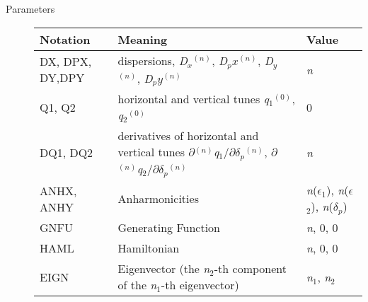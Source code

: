 \begin{description}
   \item[Parameters] 
     \begin{tabular}{p{2cm} p{7cm} p{2cm}}
       \hline 
       \textbf{Notation} & \textbf{Meaning} & \textbf{Value} \\ 
       \hline
       DX, DPX, DY,DPY & dispersions, \textit{D$_x$}$^{(n)}$,
       \textit{D$_px$}$^{(n)}$, \textit{D$_y$}$^{(n)}$,
       \textit{D$_py$}$^{(n)}$ &  
       \textit{n} \\ 
       \hline
       Q1, Q2 & horizontal and vertical tunes \textit{q}$_1$$^{(0)}$,
       \textit{q}$_2$$^{(0)}$ & 0 \\  
       \hline
       DQ1, DQ2 & derivatives of horizontal and vertical tunes
       $\partial$$^{(n)}$\textit{q}$_1$/$\partial$\textit{$\delta$}$_\textit{p}$$^{(n)}$,
       $\partial$$^{(n)}$\textit{q}$_2$/$\partial$\textit{$\delta$}$_\textit{p}$$^{(n)}$
       & \textit{n} \\  
       \hline
       ANHX, ANHY & Anharmonicities &
       \textit{n}(\textit{$\epsilon$}$_1$),
       \textit{n}(\textit{$\epsilon$}$_2$),
       \textit{n}(\textit{$\delta$}$_\textit{p}$) \\  
       \hline
       GNFU & Generating Function & \textit{n}, 0, 0 \\ 
       \hline
       HAML & Hamiltonian  & \textit{n}, 0, 0 \\ 
       \hline
       EIGN & Eigenvector (the \textit{n}$_2$-th component of the
       \textit{n}$_1$-th eigenvector) & \textit{n}$_1$, \textit{n}$_2$
       \\  
       \hline
     \end{tabular}
\end{description}

